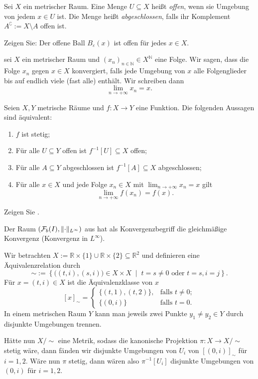 \documentclass[
12pt, 
openany, 
a4paper, 
final,
fleqn, 
]{myclass}
\numberwithin{equation}{chapter}
\numberwithin{section}{chapter}
\newcommand{\NN}{\mathbb N}
\newcommand{\RR}{\mathbb R}
\newcommand{\varF}{\mathcal F}
\newcommand{\set}[2]{\left\{#1\;\middle|\;#2\right\}}
\DeclarePairedDelimiter{\norm}{\lVert}{\rVert}
\newcommand{\todo}[1]{}
\newcommand{\TFAE}{Die folgenden Aussagen sind äquivalent}
\begin{document}
\begin{defn}\label{1.10}


Sei $X$ ein metrischer Raum. Eine Menge $U\subseteq X$ heißt \emph{offen}, wenn sie Umgebung von jedem $x\in U$ ist. Die Menge heißt \emph{abgeschlossen}, falls ihr Komplement $A^\complement := X\setminus A$ offen ist. 
\end{defn}
\begin{ex}
Zeigen Sie: Der offene Ball $B_\varepsilon(x)$ ist offen für jedes $x\in X$. 
\end{ex}
\begin{defn}
sei $X$ ein metrischer Raum und $(x_n)_{n\in \NN}\in X^\NN$ eine Folge. Wir sagen, dass die Folge $x_n$ gegen $x\in X$ konvergiert, falls jede Umgebung von $x$ alle Folgenglieder bis auf endlich viele (fast alle) enthält. Wir schreiben dann
\[
\lim_{n\to +\infty} x_n = x.
\]
\end{defn}
\begin{thr}\label{1.11}
Seien $X, Y$ metrische Räume und $f: X\to Y$ eine Funktion. {\TFAE}: 
\begin{enumerate}
\item $f$ ist stetig; 
\item Für alle $U\subseteq Y$ offen ist $f^{-1}[U]\subseteq X$ offen; 
\item Für alle $A\subseteq Y$ abgeschlossen ist $f^{-1}[A] \subseteq X$ abgeschlossen; 
\item Für alle $x\in X$ und jede Folge $x_n\in X$ mit $\lim_{n\to + \infty} x_n = x$ gilt 
\[
\lim_{n\to +\infty} f(x_n) = f(x).
\]
\end{enumerate}
\end{thr}
\begin{ex}
Zeigen Sie . 
\end{ex}

\begin{eg}\label{1.13}
Der Raum $ (\varF_b(I), \norm{\cdot}_{L^{\infty}}) $ aus  hat als Konvergenzbegriff die gleichmäßige Konvergenz (Konvergenz in $ L^{\infty} $).
\end{eg}
\begin{eg}\label{1.14}
Wir betrachten $X:= \mathbb{R}\times \{1\} \cup \mathbb{R}\times\{2\}\subseteq \RR^2$ und definieren eine Äquivalenzrelation durch 
\[ 
\sim := \set{
\big((t, i), (s, i)\big)\in X\times X}{ t= s \neq 0 \text{ oder } t=s, i=j
}.
\]
Für $ x=(t, i)\in X $ ist die Äquivalenzklasse von $x$
\[
[x]_{\sim} =
\begin{cases}
\{(t, 1), (t, 2)\},  & \text{falls }t\neq 0; \\
\{(0,i)\} & \text{falls }t=0.
\end{cases}
\]
In einem metrischen Raum $Y$ kann man jeweils zwei Punkte $y_1 \neq y_2 \in Y$ durch disjunkte Umgebungen trennen. 

Hätte nun $X/\sim$ eine Metrik, sodass die kanonische Projektion $\pi: X\to X/\sim$ stetig wäre, dann fänden wir disjunkte Umgebungen von $ U_{i} $ von $[(0,i)]_{\sim}$ für $ i=1,2 $. Wäre nun $ \pi $ stetig, dann wären also $ \pi^{-1}[U_{i}] $ disjunkte Umgebungen von $ (0,i) $ für $ i=1,2 $. \todo{Das Beispiel muss noch mal überarbeitet werden.}
\end{eg}
\end{document}
